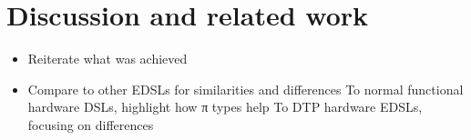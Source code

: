 \chapter{Discussion and related work}
\label{chap:discussion-related-work}
    \begin{itemize}
        \item Reiterate what was achieved
        \item Compare to other \acp{EDSL} for similarities and differences
            \subitem To normal functional hardware DSLs, highlight how π types help
            \subitem To DTP hardware EDSLs, focusing on differences
    \end{itemize}




